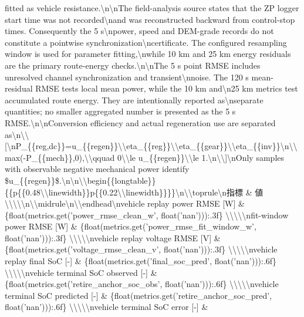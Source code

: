 \documentclass[a4paper,11pt]{article}
\begin{document}
\begin{enumerate}[leftmargin=1.8em]
fitted as vehicle resistance.\textbackslash{}n\textbackslash{}nThe field-analysis source states that the ZP logger start time was not recorded\textbackslash{}nand was reconstructed backward from control-stop times. Consequently the 5 s\textbackslash{}npower, speed and DEM-grade records do not constitute a pointwise synchronization\textbackslash{}ncertificate. The configured resampling window is used for parameter fitting,\textbackslash{}nwhile 10 km and 25 km energy residuals are the primary route-energy checks.\textbackslash{}n\textbackslash{}nThe 5 s point RMSE includes unresolved channel synchronization and transient\textbackslash{}nnoise. The 120 s mean-residual RMSE tests local mean power, while the 10 km and\textbackslash{}n25 km metrics test accumulated route energy. They are intentionally reported as\textbackslash{}nseparate quantities; no smaller aggregated number is presented as the 5 s RMSE.\textbackslash{}n\textbackslash{}nConversion efficiency and actual regeneration use are separated as\textbackslash{}n\textbackslash{}\textbackslash{}[\textbackslash{}nP\_\{\{reg,dc\}\}=u\_\{\{regen\}\}\textbackslash{}\textbackslash{}eta\_\{\{reg\}\}\textbackslash{}\textbackslash{}eta\_\{\{gear\}\}\textbackslash{}\textbackslash{}eta\_\{\{inv\}\}\textbackslash{}n\textbackslash{}\textbackslash{}max(-P\_\{\{mech\}\},0),\textbackslash{}\textbackslash{}qquad 0\textbackslash{}\textbackslash{}le u\_\{\{regen\}\}\textbackslash{}\textbackslash{}le 1.\textbackslash{}n\textbackslash{}\textbackslash{}]\textbackslash{}nOnly samples with observable negative mechanical power identify \$u\_\{\{regen\}\}\$.\textbackslash{}n\textbackslash{}n\textbackslash{}\textbackslash{}begin\{\{longtable\}\}\{\{p\{\{0.48\textbackslash{}\textbackslash{}linewidth\}\}p\{\{0.22\textbackslash{}\textbackslash{}linewidth\}\}\}\}\textbackslash{}n\textbackslash{}\textbackslash{}toprule\textbackslash{}n指標 \& 値 \textbackslash{}\textbackslash{}\textbackslash{}\textbackslash{}\textbackslash{}n\textbackslash{}\textbackslash{}midrule\textbackslash{}n\textbackslash{}\textbackslash{}endhead\textbackslash{}nvehicle replay power RMSE [W] \& \{float(metrics.get('power\_rmse\_clean\_w', float('nan'))):.3f\} \textbackslash{}\textbackslash{}\textbackslash{}\textbackslash{}\textbackslash{}nfit-window power RMSE [W] \& \{float(metrics.get('power\_rmse\_fit\_window\_w', float('nan'))):.3f\} \textbackslash{}\textbackslash{}\textbackslash{}\textbackslash{}\textbackslash{}nvehicle replay voltage RMSE [V] \& \{float(metrics.get('voltage\_rmse\_clean\_v', float('nan'))):.3f\} \textbackslash{}\textbackslash{}\textbackslash{}\textbackslash{}\textbackslash{}nvehicle replay final SoC [-] \& \{float(metrics.get('final\_soc\_pred', float('nan'))):.6f\} \textbackslash{}\textbackslash{}\textbackslash{}\textbackslash{}\textbackslash{}nvehicle terminal SoC observed [-] \& \{float(metrics.get('retire\_anchor\_soc\_obs', float('nan'))):.6f\} \textbackslash{}\textbackslash{}\textbackslash{}\textbackslash{}\textbackslash{}nvehicle terminal SoC predicted [-] \& \{float(metrics.get('retire\_anchor\_soc\_pred', float('nan'))):.6f\} \textbackslash{}\textbackslash{}\textbackslash{}\textbackslash{}\textbackslash{}nvehicle terminal SoC error [-] \& 
\end{enumerate}
\end{document}

